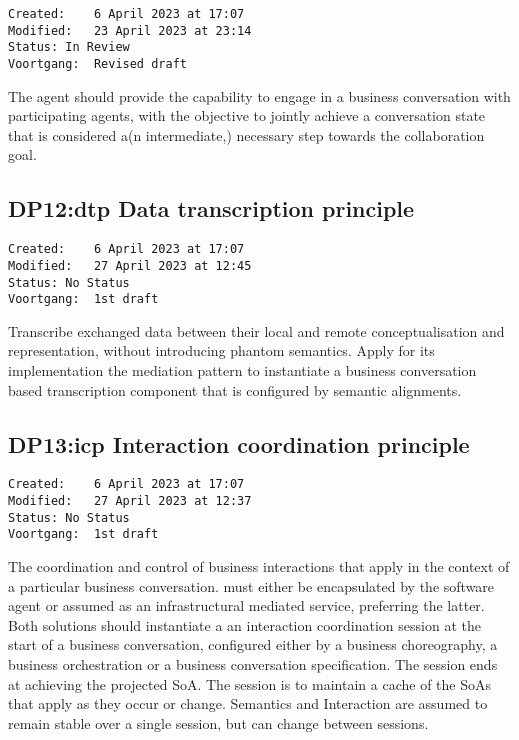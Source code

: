 \documentclass[sort&compress,preprint,3p,authoryear,twocolumn]{elsarticle}
\theoremstyle{break}			%
\begin{document}
\begin{verbatim}
Created:    6 April 2023 at 17:07
Modified:   23 April 2023 at 23:14
Status: In Review
Voortgang:  Revised draft
\end{verbatim}

The agent should provide the capability to engage in a business
conversation with participating agents, with the objective to jointly
achieve a conversation state that is considered a(n intermediate,)
necessary step towards the collaboration goal.

\subsection{DP12:dtp Data transcription
principle}\label{dp12dtp-data-transcription-principle}

\begin{verbatim}
Created:    6 April 2023 at 17:07
Modified:   27 April 2023 at 12:45
Status: No Status
Voortgang:  1st draft
\end{verbatim}

Transcribe exchanged data between their local and remote
conceptualisation and representation, without introducing phantom
semantics. Apply for its implementation the mediation pattern to
instantiate a business conversation based transcription component that
is configured by semantic alignments.

\subsection{DP13:icp Interaction coordination
principle}\label{dp13icp-interaction-coordination-principle}

\begin{verbatim}
Created:    6 April 2023 at 17:07
Modified:   27 April 2023 at 12:37
Status: No Status
Voortgang:  1st draft
\end{verbatim}

The coordination and control of business interactions that apply in the
context of a particular business conversation. must either be
encapsulated by the software agent or assumed as an infrastructural
mediated service, preferring the latter. Both solutions should
instantiate a an interaction coordination session at the start of a
business conversation, configured either by a business choreography, a
business orchestration or a business conversation specification. The
session ends at achieving the projected SoA. The session is to maintain
a cache of the SoAs that apply as they occur or change. Semantics and
Interaction are assumed to remain stable over a single session, but can
change between sessions.
\end{document}
